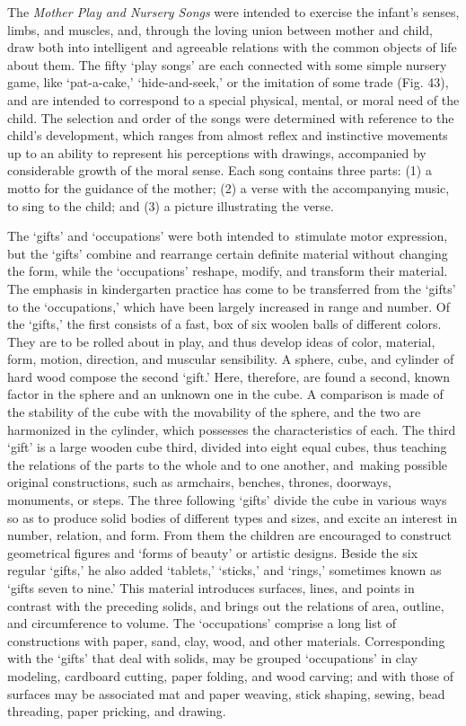 \documentclass[]{book}
\begin{document}
The \emph{Mother Play and Nursery Songs} were intended to exercise the infant's senses, limbs, and muscles, and, through the loving union between mother and child, draw both into intelligent and agreeable relations with the common objects of life about them. The fifty `play songs' are each connected with some simple nursery game, like `pat-a-cake,' `hide-and-seek,' or the imitation of some trade (Fig. 43), and are intended to correspond to a special physical, mental, or moral need of the child. The selection and order of the songs were determined with reference to the child's development, which ranges from almost reflex and instinctive movements up to an ability to represent his perceptions with drawings, accompanied by considerable growth of the moral sense. Each song contains three parts: (1) a motto for the guidance of the mother; (2) a verse with the accompanying music, to sing to the child; and (3) a picture illustrating the verse.

The `gifts' and `occupations' were both intended to~stimulate motor expression, but the `gifts' combine and rearrange certain definite material without changing the form, while the `occupations' reshape, modify, and transform their material. The emphasis in kindergarten practice has come to be transferred from the `gifts' to the `occupations,' which have been largely increased in range and number. Of the `gifts,' the first consists of a fast, box of six woolen balls of different colors. They are to be rolled about in play, and thus develop ideas of color, material, form, motion, direction, and muscular sensibility. A sphere, cube, and cylinder of hard wood compose the second `gift.' Here, therefore, are found a second, known factor in the sphere and an unknown one in the cube. A comparison is made of the stability of the cube with the movability of the sphere, and the two are harmonized in the cylinder, which possesses the characteristics of each. The third `gift' is a large wooden cube third, divided into eight equal cubes, thus teaching the relations of the parts to the whole and to one another, and~making possible original constructions, such as armchairs, benches, thrones, doorways, monuments, or steps. The three following `gifts' divide the cube in various ways so as to produce solid bodies of different types and sizes, and excite an interest in number, relation, and form. From them the children are encouraged to construct geometrical figures and `forms of beauty' or artistic designs. Beside the six regular `gifts,' he also added `tablets,' `sticks,' and `rings,' sometimes known as `gifts seven to nine.' This material introduces surfaces, lines, and points in contrast with the preceding solids, and brings out the relations of area, outline, and circumference to volume. The `occupations' comprise a long list of constructions with paper, sand, clay, wood, and other materials. Corresponding with the `gifts' that deal with solids, may be grouped `occupations' in clay modeling, cardboard cutting, paper folding, and wood carving; and with those of surfaces may be associated mat and paper weaving, stick shaping, sewing, bead threading, paper pricking, and drawing.
\end{document}
